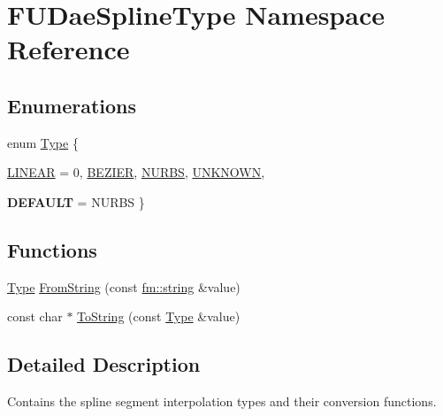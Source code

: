 \hypertarget{namespaceFUDaeSplineType}{
\section{FUDaeSplineType Namespace Reference}
\label{namespaceFUDaeSplineType}
}
\subsection*{Enumerations}
\begin{DoxyCompactItemize}
\item 
enum \hyperlink{namespaceFUDaeSplineType_a7db2b90bcd53814239cc29f64754d0ab}{Type} \{ \par
\hyperlink{namespaceFUDaeSplineType_a7db2b90bcd53814239cc29f64754d0abac04d8fe4a15bdf0ddfcb7b8c1deaf192}{LINEAR} =  0, 
\hyperlink{namespaceFUDaeSplineType_a7db2b90bcd53814239cc29f64754d0abaad88b65bd50d44451adf2cfd2afddca6}{BEZIER}, 
\hyperlink{namespaceFUDaeSplineType_a7db2b90bcd53814239cc29f64754d0abaf4b92fbab0e29b67e98286c3b125e09e}{NURBS}, 
\hyperlink{namespaceFUDaeSplineType_a7db2b90bcd53814239cc29f64754d0abaf05e5adf7918dddb5ef472a545b82d61}{UNKNOWN}, 
\par
{\bfseries DEFAULT} =  NURBS
 \}
\end{DoxyCompactItemize}
\subsection*{Functions}
\begin{DoxyCompactItemize}
\item 
\hyperlink{namespaceFUDaeSplineType_a7db2b90bcd53814239cc29f64754d0ab}{Type} \hyperlink{namespaceFUDaeSplineType_a59eb0d993cda7985124b057f00c4b195}{FromString} (const \hyperlink{classfm_1_1stringT}{fm::string} \&value)
\item 
const char $\ast$ \hyperlink{namespaceFUDaeSplineType_a7a098e5b8f2df1788eba728011751b58}{ToString} (const \hyperlink{namespaceFUDaeSplineType_a7db2b90bcd53814239cc29f64754d0ab}{Type} \&value)
\end{DoxyCompactItemize}


\subsection{Detailed Description}
Contains the spline segment interpolation types and their conversion functions. 

